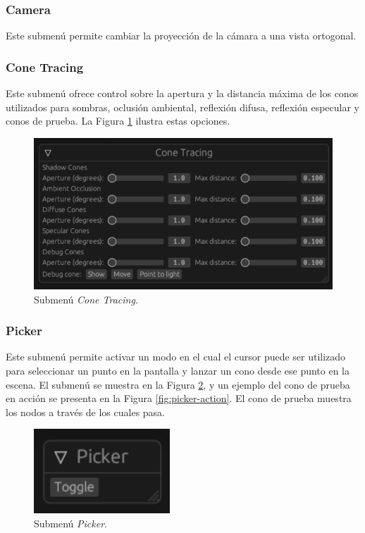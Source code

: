 \subsubsection{Camera}

Este submenú permite cambiar la proyección de la cámara a una vista ortogonal.

\subsubsection{Cone Tracing}

Este submenú ofrece control sobre la apertura y la distancia máxima de los conos utilizados para sombras, oclusión ambiental, reflexión difusa, reflexión especular y conos de prueba. La Figura \ref{fig:cone_tracing} ilustra estas opciones.

\begin{figure}[h]
    \centering
    \includegraphics[width=.5\textwidth]{cone_tracing.png}
    \caption{Submenú \textit{Cone Tracing}.}
    \label{fig:cone_tracing}
\end{figure}

\subsubsection{Picker}

Este submenú permite activar un modo en el cual el cursor puede ser utilizado para seleccionar un punto en la pantalla y lanzar un cono desde ese punto en la escena. El submenú se muestra en la Figura \ref{fig:picker-menu}, y un ejemplo del cono de prueba en acción se presenta en la Figura \ref{fig:picker-action}. El cono de prueba muestra los nodos a través de los cuales pasa.

\begin{figure}[h]
    \centering
    \includegraphics[width=.5\textwidth]{picker-menu.png}
    \caption{Submenú \textit{Picker}.}
    \label{fig:picker-menu}
\end{figure}

